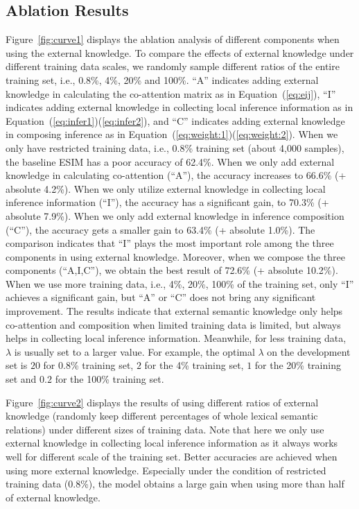 \documentclass[11pt,a4paper]{article}
\begin{document}
\subsection{Ablation Results}
Figure~\ref{fig:curve1} displays the ablation analysis of different components when using the external knowledge. To compare the effects of external knowledge under different training data scales, we randomly sample different ratios of the entire training set, i.e., 0.8\%, 4\%, 20\% and 100\%. ``A'' indicates adding external knowledge in calculating the co-attention matrix as in Equation~(\ref{eq:eij}), ``I'' indicates adding external knowledge in collecting local inference information as in Equation~(\ref{eq:infer1})(\ref{eq:infer2}), and ``C'' indicates adding external knowledge in composing inference as in Equation~(\ref{eq:weight:1})(\ref{eq:weight:2}). When we only have restricted training data, i.e., 0.8\% training set (about 4,000 samples), the baseline ESIM has a poor accuracy of 62.4\%. When we only add external knowledge in calculating co-attention (``A''), the accuracy increases to 66.6\% (+ absolute 4.2\%). When we only utilize external knowledge in collecting local inference information (``I''), the accuracy has a significant gain, to 70.3\% (+ absolute 7.9\%). When we only add external knowledge in inference composition (``C''), the accuracy gets a smaller gain to 63.4\% (+ absolute 1.0\%). The comparison indicates that ``I'' plays the most important role among the three components in using external knowledge. Moreover, when we compose the three components (``A,I,C''), we obtain the best result of 72.6\% (+ absolute 10.2\%). When we use more training data, i.e., 4\%, 20\%, 100\% of the training set, only ``I'' achieves a significant gain, but ``A'' or ``C'' does not bring any significant improvement. The results indicate that external semantic knowledge only helps co-attention and composition when limited training data is limited, but always helps in collecting local inference information. Meanwhile, for less training data, $\lambda$ is usually set to a larger value. For example, the optimal $\lambda$ on the development set is $20$ for 0.8\% training set, $2$ for the 4\% training set, $1$ for the 20\% training set and $0.2$ for the 100\% training set.

Figure~\ref{fig:curve2} displays the results of using different ratios of external knowledge (randomly keep different percentages of whole lexical semantic relations) under different sizes of training data. Note that here we only use external knowledge in collecting local inference information as it always works well for different scale of the training set. Better accuracies are achieved when using more external knowledge. Especially under the condition of restricted training data (0.8\%), the model obtains a large gain when using more than half of external knowledge.
\end{document}
